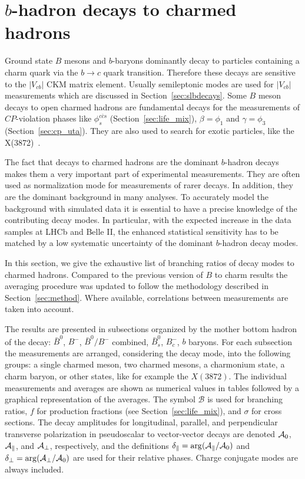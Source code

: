 \section{$b$-hadron decays to charmed hadrons}
\label{sec:b2c}
Ground state $B$ mesons and $b$-baryons dominantly decay to particles containing a charm quark via the $b \rightarrow c$ quark transition.
Therefore these decays are sensitive to the $|V_{cb}|$ CKM matrix element.
Usually semileptonic modes are used for $|V_{cb}|$ measurements which are discussed in Section~\ref{sec:slbdecays}.
Some $B$ meson decays to open charmed hadrons are fundamental decays for the measurements of $CP$-violation phases like $\phi_s^{c\bar{c}s}$ (Section~\ref{sec:life_mix}), $\beta=\phi_1$ and $\gamma=\phi_3$ (Section~\ref{sec:cp_uta}). 
They are also used to search for exotic particles, like the X(3872)~\cite{Choi:2003ue}.

The fact that decays to charmed hadrons are the dominant $b$-hadron decays makes them a very important part of experimental measurements.
They are often used as normalization mode for measurements of rarer decays.
In addition, they are the dominant background in many analyses.
To accurately model the background with simulated data it is essential to have a precise knowledge of the contributing decay modes.
In particular, with the expected increase in the data samples at LHCb and Belle II, the enhanced statistical sensitivity has to be matched by a low systematic uncertainty of the dominant $b$-hadron decay modes.

In this section, we give the exhaustive list of branching ratios of decay modes to charmed hadrons.
Compared to the previous version of $B$ to charm results the averaging procedure was updated to follow the methodology described in Section~\ref{sec:method}.
Where available, correlations between measurements 
are taken into account.

The results are presented in subsections organized by the mother bottom hadron of the decay: $\bar{B}^0$, $B^-$, $\bar{B}^0/B^-$ combined, $\bar{B}_s^0$, $B_c^-$, $b$ baryons.
For each subsection the measurements are arranged, considering the decay mode, into the following groups: a single charmed meson, two charmed mesons, a charmonium state, a charm baryon, or other states, like for example the $X(3872)$.
The individual measurements and averages are shown as numerical values in tables followed by a graphical representation of the averages.
The symbol $\mathcal{B}$ is used for branching ratios, $f$ for production fractions (see Section~\ref{sec:life_mix}), and $\sigma$ for cross sections.
The decay amplitudes for longitudinal, parallel, and perpendicular transverse polarization in pseudoscalar to vector-vector decays are denoted ${\cal{A}}_0$, ${\cal{A}}_\parallel$, and ${\cal{A}}_\perp$, respectively, and the definitions $\delta_\parallel = \arg({\cal{A}}_\parallel/{\cal{A}}_0)$ and $\delta_\perp = \arg({\cal{A}}_\perp/{\cal{A}}_0)$ are used for their relative phases.
Charge conjugate modes are always included.

